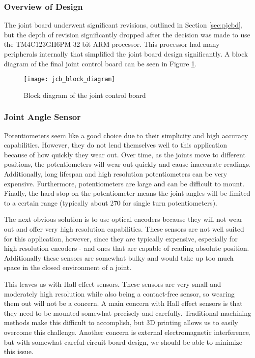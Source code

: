 \subsubsection{Overview of Design}
The joint board underwent significant revisions, outlined in Section \ref{sec:pjcbd}, but the depth of revision significantly dropped after the decision was made to use the TM4C123GH6PM 32-bit ARM processor. This processor had many peripherals internally that simplified the joint board design significantly. A block diagram of the final joint control board can be seen in Figure \ref{fig:jcb_block_diagram}.
\begin{figure}[H]
	\centering
	\texttt{[image: jcb\_block\_diagram]}
	\caption{Block diagram of the joint control board}
	\label{fig:jcb_block_diagram}
\end{figure}

\subsubsection{Joint Angle Sensor}
\label{sec:jas}
Potentiometers seem like a good choice due to their simplicity and high accuracy capabilities. However, they do not lend themselves well to this application because of how quickly they wear out. Over time, as the joints move to different positions, the potentiometers will wear out quickly and cause inaccurate readings. Additionally, long lifespan and high resolution potentiometers can be very expensive. Furthermore, potentiometers are large and can be difficult to mount. Finally, the hard stop on the potentiometer means the joint angles will be limited to a certain range (typically about 270 \textdegree for single turn potentiometers).

\noindent The next obvious solution is to use optical encoders because they will not wear out and offer very high resolution capabilities. These sensors are not well suited for this application, however, since they are typically expensive, especially for high resolution encoders - and ones that are capable of reading absolute position. Additionally these sensors are somewhat bulky and would take up too much space in the closed environment of a joint. 

\noindent This leaves us with Hall effect sensors. These sensors are very small and moderately high resolution while also being a contact-free sensor, so wearing them out will not be a concern. A main concern with Hall effect sensors is that they need to be mounted somewhat precisely and carefully. Traditional machining methods make this difficult to accomplish, but 3D printing allows us to easily overcome this challenge.  Another concern is external electromagnetic interference, but with somewhat careful circuit board design, we should be able to minimize this issue.

